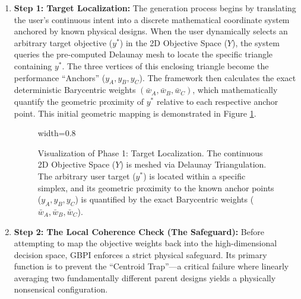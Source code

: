 \begin{enumerate}

    \item \textbf{Step 1: Target Localization:} 
    The generation process begins by translating the user's continuous intent into a discrete mathematical coordinate system anchored by known physical designs. When the user dynamically selects an arbitrary target objective ($y^*$) in the 2D Objective Space ($Y$), the system queries the pre-computed Delaunay mesh to locate the specific triangle containing $y^*$. The three vertices of this enclosing triangle become the performance ``Anchors'' ($y_A, y_B, y_C$). The framework then calculates the exact deterministic Barycentric weights $(\bar{w}_A, \bar{w}_B, \bar{w}_C)$, which mathematically quantify the geometric proximity of $y^*$ relative to each respective anchor point. This initial geometric mapping is demonstrated in Figure \ref{fig:target_localization}.

    \begin{figure}[htbp]
        \centering
        \begin{adjustbox}{width=0.8\linewidth}
          
      \end{adjustbox}
        \caption[Phase 1: Target Localization in Objective Space]{Visualization of Phase 1: Target Localization. The continuous 2D Objective Space ($Y$) is meshed via Delaunay Triangulation. The arbitrary user target ($y^*$) is located within a specific simplex, and its geometric proximity to the known anchor points ($y_A, y_B, y_C$) is quantified by the exact Barycentric weights ($\bar{w}_A, \bar{w}_B, \bar{w}_C$).}
        \label{fig:target_localization}
    \end{figure}

    \item \textbf{Step 2: The Local Coherence Check (The Safeguard):} 
    Before attempting to map the objective weights back into the high-dimensional decision space, GBPI enforces a strict physical safeguard. Its primary function is to prevent the ``Centroid Trap''—a critical failure where linearly averaging two fundamentally different parent designs yields a physically nonsensical configuration. 
    

\end{enumerate}
